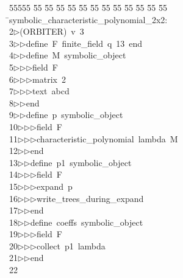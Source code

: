 %
%
\begin{tabbing}
55555 \= 55 \= 55 \= 55 \= 55 \= 55 \= 55 \= 55 \= 55 \= 55 \= 55 \= 55 \= 55 \= \>symbolic\_characteristic\_polynomial\_2x2:\\[0pt]
2\>$\triangleright$\>(ORBITER)\ v\ 3\ \\[0pt]
3\>$\triangleright$\>$\triangleright$\>define\ F\ finite\_field\ q\ 13\ end\ \\[0pt]
4\>$\triangleright$\>$\triangleright$\>define\ M\ symbolic\_object\ \\[0pt]
5\>$\triangleright$\>$\triangleright$\>$\triangleright$\>field\ F\ \\[0pt]
6\>$\triangleright$\>$\triangleright$\>$\triangleright$\>matrix\ 2\ \\[0pt]
7\>$\triangleright$\>$\triangleright$\>$\triangleright$\>text\ abcd\ \\[0pt]
8\>$\triangleright$\>$\triangleright$\>end\ \\[0pt]
9\>$\triangleright$\>$\triangleright$\>define\ p\ symbolic\_object\ \\[0pt]
10\>$\triangleright$\>$\triangleright$\>$\triangleright$\>field\ F\ \\[0pt]
11\>$\triangleright$\>$\triangleright$\>$\triangleright$\>characteristic\_polynomial\ lambda\ M\ \\[0pt]
12\>$\triangleright$\>$\triangleright$\>end\ \\[0pt]
13\>$\triangleright$\>$\triangleright$\>define\ p1\ symbolic\_object\ \\[0pt]
14\>$\triangleright$\>$\triangleright$\>$\triangleright$\>field\ F\ \\[0pt]
15\>$\triangleright$\>$\triangleright$\>$\triangleright$\>expand\ p\ \\[0pt]
16\>$\triangleright$\>$\triangleright$\>$\triangleright$\>write\_trees\_during\_expand\ \\[0pt]
17\>$\triangleright$\>$\triangleright$\>end\ \\[0pt]
18\>$\triangleright$\>$\triangleright$\>define\ coeffs\ symbolic\_object\ \\[0pt]
19\>$\triangleright$\>$\triangleright$\>$\triangleright$\>field\ F\ \\[0pt]
20\>$\triangleright$\>$\triangleright$\>$\triangleright$\>collect\ p1\ lambda\ \\[0pt]
21\>$\triangleright$\>$\triangleright$\>end\\[0pt]
22\>\end{tabbing}
